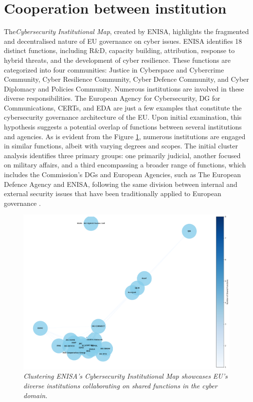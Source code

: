 \section{Cooperation between institution}

The\textit{Cybersecurity Institutional Map}, created by ENISA, highlights the fragmented and decentralised nature of EU governance on cyber issues. ENISA identifies 18 distinct functions, including R\&D, capacity building, attribution, response to hybrid threats, and the development of cyber resilience. These functions are categorized into four communities: Justice in Cyberspace and Cybercrime Community, Cyber Resilience Community, Cyber Defence Community, and Cyber Diplomacy and Policies Community. Numerous institutions are involved in these diverse responsibilities. The European Agency for Cybersecurity, DG for Communications, CERTs, and EDA are just a few examples that constitute the cybersecurity governance architecture of the EU. Upon initial examination, this hypothesis suggests a potential overlap of functions between several institutions and agencies. As is evident from the Figure \ref{institutional_map.png}, numerous institutions are engaged in similar functions, albeit with varying degrees and scopes. The initial cluster analysis identifies three primary groups: one primarily judicial, another focused on military affairs, and a third encompassing a broader range of functions, which includes the Commission’s DGs and European Agencies, such as The European Defence Agency and ENISA, following the same division between internal and external security issues that have been traditionally applied to European governance \autocite{miadzvetskaya_2021_the}.

\begin{figure}[H]
\centering
\includegraphics[width=1\textwidth]{Images/institutional_map.png}
\caption{\textit{Clustering ENISA's Cybersecurity Institutional Map showcases EU's diverse institutions collaborating on shared functions in the cyber domain.}}
\label{institutional_map.png}
\end{figure}

